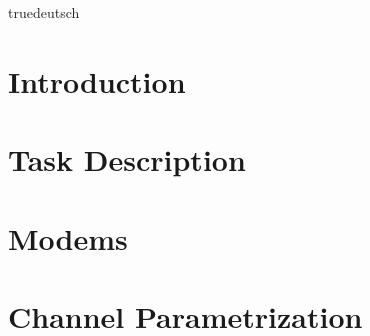 \documentclass[a4paper,fleqn,english]{book}
\begin{document}

\zusammenfassung%
{truedeutsch} %
{} %
{} %





\mainmatter%
\pagestyle{fancy}%
\chapter{Introduction}

%
\chapter{Task Description}%
%
%
\chapter{Modems}%
%
%
\chapter{Channel Parametrization}%
%
%
\end{document}
